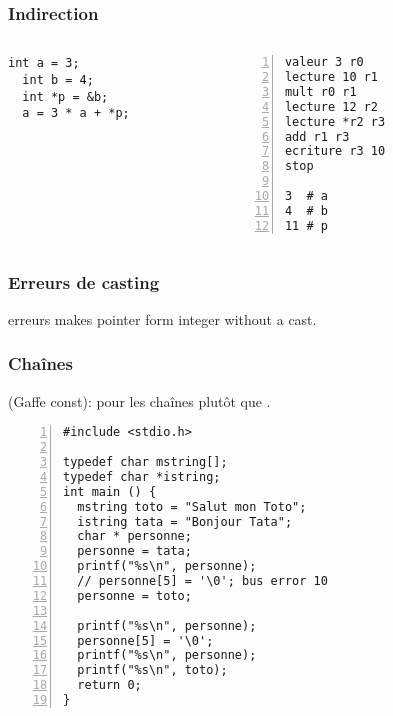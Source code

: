 \documentclass[xcolor=pdftex,svgnames,table]{beamer}
\begin{document}
\begin{frame}[fragile]
  \frametitle{Indirection}

\begin{columns}
\begin{column}[b]{3.7cm}

\begin{lstlisting}[basicstyle=\ttfamily]
  int a = 3;
  int b = 4;
  int *p = &b;
  a = 3 * a + *p;
\end{lstlisting}

\end{column}
\begin{column}[b]{3.7cm}
\begin{lstlisting}[numbers=left,basicstyle=\ttfamily\small]
valeur 3 r0
lecture 10 r1
mult r0 r1
lecture 12 r2
lecture *r2 r3
add r1 r3
ecriture r3 10
stop

3  # a
4  # b
11 # p
\end{lstlisting}
\end{column}
\end{columns}
\end{frame}

\begin{frame}
  \frametitle{Erreurs de casting}
erreurs makes pointer form integer without a cast.
\end{frame}

\begin{frame}[fragile]
  \frametitle{Chaînes}

(Gaffe const): pour les chaînes  plutôt que .

\begin{lstlisting}[numbers=left,basicstyle=\ttfamily\small]
#include <stdio.h>

typedef char mstring[];
typedef char *istring;
int main () {
  mstring toto = "Salut mon Toto";
  istring tata = "Bonjour Tata";
  char * personne;
  personne = tata;
  printf("%s\n", personne);
  // personne[5] = '\0'; bus error 10
  personne = toto;

  printf("%s\n", personne);
  personne[5] = '\0';
  printf("%s\n", personne);
  printf("%s\n", toto);
  return 0;
}

\end{lstlisting}


\end{frame}
\end{document}
